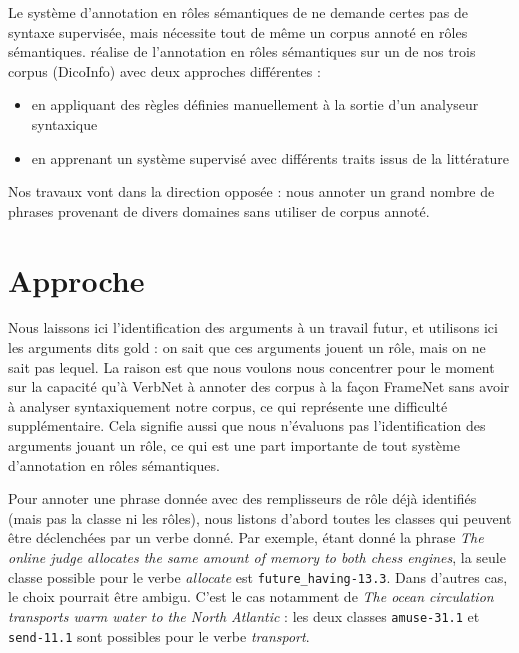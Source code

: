Le système d'annotation en rôles sémantiques de \cite{gormley2014low} ne
demande certes pas de syntaxe supervisée, mais nécessite tout de même un corpus
annoté en rôles sémantiques. \cite{hadouche2011annotation} réalise de
l'annotation en rôles sémantiques sur un de nos trois corpus (DicoInfo) avec
deux approches différentes :

\begin{itemize}

    \item en appliquant des règles définies manuellement à la sortie d'un
        analyseur syntaxique

    \item en apprenant un système supervisé avec différents traits issus de la
        littérature

\end{itemize}

Nos travaux vont dans la direction opposée : nous annoter un grand nombre de
phrases provenant de divers domaines sans utiliser de corpus annoté.

\section{Approche}

Nous laissons ici l'identification des arguments à un travail futur, et
utilisons ici les arguments dits gold : on sait que ces arguments jouent un
rôle, mais on ne sait pas lequel. La raison est que nous voulons nous
concentrer pour le moment sur la capacité qu'à VerbNet à annoter des corpus à
la façon FrameNet sans avoir à analyser syntaxiquement notre corpus, ce qui
représente une difficulté supplémentaire. Cela signifie aussi que nous
n'évaluons pas l'identification des arguments jouant un rôle, ce qui est une
part importante de tout système d'annotation en rôles sémantiques.

Pour annoter une phrase donnée avec des remplisseurs de rôle déjà identifiés
(mais pas la classe ni les rôles), nous listons d'abord toutes les classes qui
peuvent être déclenchées par un verbe donné. Par exemple, étant donné la phrase
\emph{The online judge allocates the same amount of memory to both chess
engines}, la seule classe possible pour le verbe \emph{allocate} est
\texttt{future\_having-13.3}. Dans d'autres cas, le choix pourrait être ambigu.
C'est le cas notamment de \emph{The ocean circulation transports warm water to
the North Atlantic} : les deux classes \texttt{amuse-31.1} et
\texttt{send-11.1} sont possibles pour le verbe \emph{transport}.

